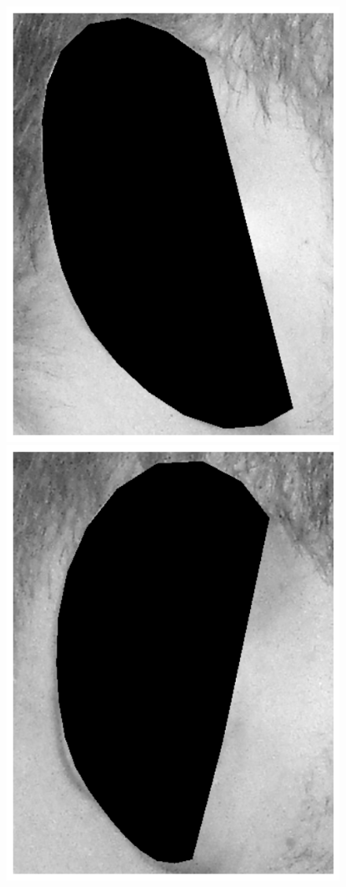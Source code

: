 \begin{figure}[!t]
    \includegraphics[height=\flowhh]{resources/Ear_Deformable_Model/verification/background_exp/ear_bg_1}
    \hfill
    \includegraphics[height=\flowhh]{resources/Ear_Deformable_Model/verification/background_exp/ear_bg_2}

\end{figure}
